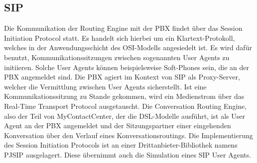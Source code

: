 \subsection{SIP}
Die Kommunikation der Routing Engine mit der PBX findet über das Session Initiation Protocol statt. Es handelt sich hierbei um ein Klartext-Protokoll, welches in der Anwendungsschicht des OSI-Modells angesiedelt ist. Es wird dafür benutzt, Kommunikationssitzungen zwischen sogenannten User Agents zu initiieren. Solche User Agents können beispielsweise Soft-Phones sein, die an der PBX angemeldet sind. Die PBX agiert im Kontext von SIP als Proxy-Server, welcher die Vermittlung zwischen User Agents sicherstellt. Ist eine Kommunikationssitzung zu Stande gekommen, wird ein Medienstrom über das Real-Time Transport Protocol ausgetauscht. Die Conversation Routing Engine, also der Teil von MyContactCenter, der die DSL-Modelle ausführt, ist als User Agent an der PBX angemeldet und der Sitzungspartner einer eingehenden Konversation über den Verlauf eines Konversationsroutings. Die Implementierung des Session Initiation Protocols ist an einer Drittanbieter-Bibliothek namens PJSIP ausgelagert. Diese übernimmt auch die Simulation eines SIP User Agents. 